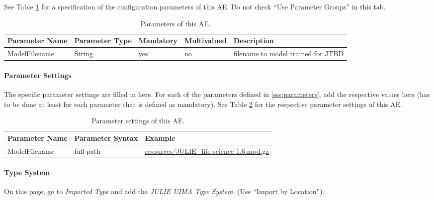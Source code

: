 \documentclass[11pt,a4paper,halfparskip]{scrartcl}
\begin{document}
See Table \ref{tab:parameters} for a specification of the
configuration parameters of this AE. Do not check ``Use Parameter
Groups'' in this tab.

\begin{table}[h!]
  \centering
  \begin{tabular}{|p{4cm}|p{2cm}|p{2cm}|p{2cm}|p{4cm}|}
    \hline
    Parameter Name & Parameter Type & Mandatory & Multivalued & Description \\
    \hline\hline
    ModelFilename & String & yes & no & filename to model trained for JTBD\\
    \hline
  \end{tabular}
  \caption{Parameters of this AE.}
  \label{tab:parameters}
\end{table}


\paragraph{Parameter Settings}
\label{sss:param_settings}

The specific parameter settings are filled in here. For each of the
parameters defined in \ref{sss:parameters}, add the respective values
here (has to be done at least for each parameter that is defined as
mandatory). See Table \ref{tab:param_settings} for the respective
parameter settings of this AE.

\begin{table}[h!]
  \centering
  \begin{tabular}{|p{4cm}|p{4cm}|p{7cm}|}
    \hline
    Parameter Name & Parameter Syntax & Example \\
    \hline\hline
    ModelFilename & full path & \url{resources/JULIE_life-science-1.6.mod.gz}\\
    \hline
  \end{tabular}
  \caption{Parameter settings of this AE.}
  \label{tab:param_settings}
\end{table}

\paragraph{Type System}
\label{sss:type_system}
On this page, go to \emph{Imported Type} and add the \emph{JULIE UIMA
  Type System}. (Use ``Import by Location'').
\end{document}

